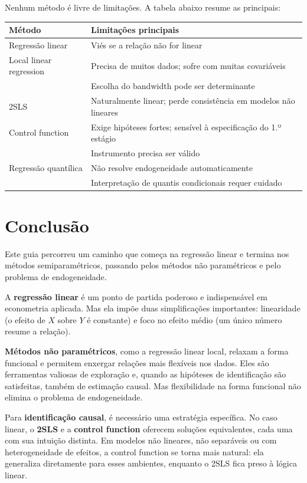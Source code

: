 Nenhum método é livre de limitações. A tabela abaixo resume as principais:

\medskip
\begin{center}
\begin{tabular}{ll}
\hline
\textbf{Método} & \textbf{Limitações principais} \\
\hline
Regressão linear & Viés se a relação não for linear \\
Local linear regression & Precisa de muitos dados; sofre com muitas covariáveis \\
& Escolha do bandwidth pode ser determinante \\
2SLS & Naturalmente linear; perde consistência em modelos não lineares \\
Control function & Exige hipóteses fortes; sensível à especificação do 1.º estágio \\
& Instrumento precisa ser válido \\
Regressão quantílica & Não resolve endogeneidade automaticamente \\
& Interpretação de quantis condicionais requer cuidado \\
\hline
\end{tabular}
\end{center}

\chapter{Conclusão}

Este guia percorreu um caminho que começa na regressão linear e termina nos métodos
semiparamétricos, passando pelos métodos não paramétricos e pelo problema de
endogeneidade.

A \textbf{regressão linear} é um ponto de partida poderoso e indispensável em
econometria aplicada. Mas ela impõe duas simplificações importantes: linearidade
(o efeito de $X$ sobre $Y$ é constante) e foco no efeito médio (um único número
resume a relação).

\textbf{Métodos não paramétricos}, como a regressão linear local, relaxam a forma
funcional e permitem enxergar relações mais flexíveis nos dados. Eles são ferramentas
valiosas de exploração e, quando as hipóteses de identificação são satisfeitas, também
de estimação causal. Mas flexibilidade na forma funcional não elimina o problema de
endogeneidade.

Para \textbf{identificação causal}, é necessário uma estratégia específica. No caso
linear, o \textbf{2SLS} e a \textbf{control function} oferecem soluções equivalentes,
cada uma com sua intuição distinta. Em modelos não lineares, não separáveis ou com
heterogeneidade de efeitos, a control function se torna mais natural: ela generaliza
diretamente para esses ambientes, enquanto o 2SLS fica preso à lógica linear.

